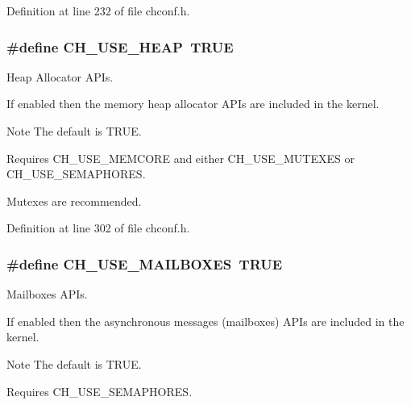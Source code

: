 Definition at line 232 of file chconf.\+h.

\hypertarget{group__config_gaaeb266ab6131572f1d8f164bddf2da3f}{}
\subsubsection[{C\+H\+\_\+\+U\+S\+E\+\_\+\+H\+E\+A\+P}]{\setlength{\rightskip}{0pt plus 5cm}\#define C\+H\+\_\+\+U\+S\+E\+\_\+\+H\+E\+A\+P~T\+R\+U\+E}\label{group__config_gaaeb266ab6131572f1d8f164bddf2da3f}


Heap Allocator A\+P\+Is. 

If enabled then the memory heap allocator A\+P\+Is are included in the kernel.

\begin{DoxyNote}{Note}
The default is {\ttfamily T\+R\+U\+E}. 

Requires {\ttfamily C\+H\+\_\+\+U\+S\+E\+\_\+\+M\+E\+M\+C\+O\+R\+E} and either {\ttfamily C\+H\+\_\+\+U\+S\+E\+\_\+\+M\+U\+T\+E\+X\+E\+S} or {\ttfamily C\+H\+\_\+\+U\+S\+E\+\_\+\+S\+E\+M\+A\+P\+H\+O\+R\+E\+S}. 

Mutexes are recommended. 
\end{DoxyNote}


Definition at line 302 of file chconf.\+h.

\hypertarget{group__config_ga6cf1736db681617019f96c4c209d2716}{}
\subsubsection[{C\+H\+\_\+\+U\+S\+E\+\_\+\+M\+A\+I\+L\+B\+O\+X\+E\+S}]{\setlength{\rightskip}{0pt plus 5cm}\#define C\+H\+\_\+\+U\+S\+E\+\_\+\+M\+A\+I\+L\+B\+O\+X\+E\+S~T\+R\+U\+E}\label{group__config_ga6cf1736db681617019f96c4c209d2716}


Mailboxes A\+P\+Is. 

If enabled then the asynchronous messages (mailboxes) A\+P\+Is are included in the kernel.

\begin{DoxyNote}{Note}
The default is {\ttfamily T\+R\+U\+E}. 

Requires {\ttfamily C\+H\+\_\+\+U\+S\+E\+\_\+\+S\+E\+M\+A\+P\+H\+O\+R\+E\+S}. 
\end{DoxyNote}


